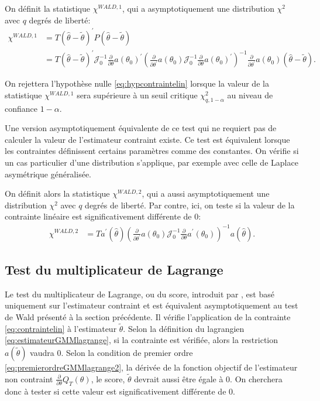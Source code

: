 On définit la statistique $\chi^{WALD,1}$, qui a asymptotiquement une
distribution $\chi^2$ avec $q$ degrés de liberté:
\begin{align}
  \label{eq:statistiqueWald}
  \chi^{WALD,1} &= T \left(\hat\theta - \tilde\theta\right)^{\prime} P
  \left(\hat\theta - \tilde\theta\right) \\
  &=T \left(\hat\theta - \tilde\theta\right)^{\prime}
  \mathcal{J}_0^{-1}\frac{\partial}{\partial\theta}a(\theta_0)^{\prime}\left(\frac{\partial}{\partial\theta^{\prime}}
    a(\theta_0) \mathcal{J}_0^{-1}
    \frac{\partial}{\partial\theta}a(\theta_0)^{\prime}
  \right)^{-1}\frac{\partial}{\partial\theta^{\prime}} a(\theta_0)
  \left(\hat\theta - \tilde\theta\right). \nonumber
\end{align}


On rejettera l'hypothèse nulle \eqref{eq:hypcontraintelin} lorsque la
valeur de la statistique $\chi^{WALD,1}$ sera supérieure à un seuil
critique $\chi_{q,1-\alpha}^2$ au niveau de confiance $1-\alpha$.

Une version asymptotiquement équivalente de ce test qui ne requiert
pas de calculer la valeur de l'estimateur contraint existe. Ce test
est équivalent lorsque les contraintes définissent certains paramètres
comme des constantes. On vérifie si un cas particulier d'une
distribution s'applique, par exemple avec celle de Laplace asymétrique
généralisée.

On définit alors la statistique $\chi^{WALD,2}$, qui a aussi
asymptotiquement une distribution $\chi^2$ avec $q$ degrés de
liberté. Par contre, ici, on teste si la valeur de la contrainte
linéaire est significativement différente de 0:
\begin{align}
  \label{eq:statistiqueWald2}
  \chi^{WALD,2} &= T a^{\prime}(\hat\theta)
  \left(\frac{\partial}{\partial\theta^{\prime}} a(\theta_0)
    \mathcal{J}_0^{-1}
    \frac{\partial}{\partial\theta}a^{\prime}(\theta_0) \right)^{-1}
  a(\hat\theta).
\end{align}


\subsection{Test du multiplicateur de Lagrange}
\label{sec:testscore}

Le test du multiplicateur de Lagrange, ou du score, introduit par
\cite{newey1987hypothesis}, est basé uniquement sur l'estimateur
contraint et est équivalent asymptotiquement au test de Wald présenté
à la section précédente. Il vérifie l'application de la contrainte
\eqref{eq:contraintelin} à l'estimateur $\tilde\theta$. Selon la
définition du lagrangien \eqref{eq:estimateurGMMlagrange}, si la
contrainte est vérifiée, alors la restriction $a(\tilde\theta)$ vaudra
0. Selon la condition de premier ordre
\eqref{eq:premierordreGMMlagrange2}, la dérivée de la fonction
objectif de l'estimateur non contraint
$\frac{\partial}{\partial\theta}Q_T(\theta)$, le score, $\tilde\theta$
devrait aussi être égale à 0. On cherchera donc à tester si cette
valeur est significativement différente de 0.

